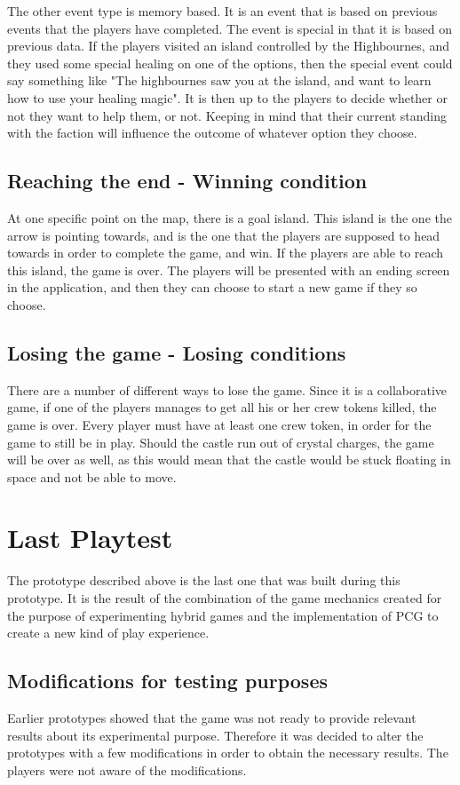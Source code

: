 The other event type is memory based. It is an event that is based on previous events that the players have completed. The event is special in that it is based on previous data. If the players visited an island controlled by the Highbournes, and they used some special healing on one of the options, then the special event could say something like "The highbournes saw you at the island, and want to learn how to use your healing magic". It is then up to the players to decide whether or not they want to help them, or not. Keeping in mind that their current standing with the faction will influence the outcome of whatever option they choose. 

\subsection{Reaching the end - Winning condition}
At one specific point on the map, there is a goal island. This island is the one the arrow is pointing towards, and is the one that the players are supposed to head towards in order to complete the game, and win.
If the players are able to reach this island, the game is over. The players will be presented with an ending screen in the application, and then they can choose to start a new game if they so choose. 

\subsection{Losing the game - Losing conditions}
There are a number of different ways to lose the game. Since it is a collaborative game, if one of the players manages to get all his or her crew tokens killed, the game is over. Every player must have at least one crew token, in order for the game to still be in play.
Should the castle run out of crystal charges, the game will be over as well, as this would mean that the castle would be stuck floating in space and not be able to move.

\section{Last Playtest}
The prototype described above is the last one that was built during this prototype. It is the result of the combination of the game mechanics created for the purpose of experimenting hybrid games and the implementation of PCG to create a new kind of play experience.
\subsection{Modifications for testing purposes}
Earlier prototypes showed that the game was not ready to provide relevant results about its experimental purpose. Therefore it was decided to alter the prototypes with a few modifications in order to obtain the necessary results. The players were not aware of the modifications.


